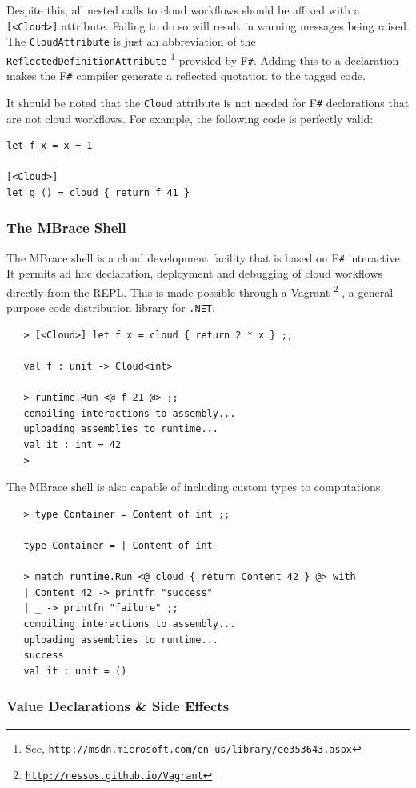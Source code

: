\documentclass[9pt,a4paper]{article}
\newcommand{\mbrace}{MBrace}
\newcommand{\TitularMbrace}{MBrace}
\newcommand{\fsharp}{F\texttt \#}
\newcommand{\dotnet}{\texttt{\hbox{.}NET}}
\newcommand{\samehref}[1]{\href{#1}{\texttt{#1}}}
\begin{document}
Despite this, all nested calls to cloud workflows should be affixed with a \texttt{[<Cloud>]}
attribute. Failing to do so will result in warning messages being raised.
The \texttt{CloudAttribute} is just an abbreviation of the \texttt{ReflectedDefinitionAttribute}%
\footnote{See, \samehref{http://msdn.microsoft.com/en-us/library/ee353643.aspx}}
provided by \fsharp{}. Adding this to a declaration makes the \fsharp{} compiler generate a 
reflected quotation to the tagged code.

It should be noted that the \texttt{Cloud} attribute is not needed for \fsharp{} declarations 
that are not cloud workflows. For example, the following code is perfectly valid:
\begin{lstlisting}
let f x = x + 1

[<Cloud>]
let g () = cloud { return f 41 }
\end{lstlisting}

\subsubsection*{The \TitularMbrace{} Shell}

The \mbrace{} shell is a cloud development facility that is based on \fsharp{} interactive.
It permits ad hoc declaration, deployment and debugging of cloud workflows directly from the REPL. 
This is made possible through a Vagrant%
\footnote{\samehref{http://nessos.github.io/Vagrant}}
, a general purpose code distribution library for \dotnet{}.
\begin{verbatim}
   > [<Cloud>] let f x = cloud { return 2 * x } ;;

   val f : unit -> Cloud<int>

   > runtime.Run <@ f 21 @> ;;
   compiling interactions to assembly... 
   uploading assemblies to runtime... 
   val it : int = 42
   >
\end{verbatim}
The \mbrace{} shell is also capable of including custom types to computations.
\begin{verbatim}
   > type Container = Content of int ;;

   type Container = | Content of int

   > match runtime.Run <@ cloud { return Content 42 } @> with
   | Content 42 -> printfn "success"
   | _ -> printfn "failure" ;;
   compiling interactions to assembly... 
   uploading assemblies to runtime... 
   success
   val it : unit = ()
\end{verbatim}


\subsubsection*{Value Declarations \& Side Effects}
\end{document}

